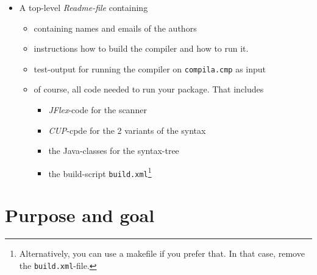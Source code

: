 \documentclass[10pt,freeform]{handout}[2014/08/13]
\begin{document}
\begin{itemize}
\item A top-level \emph{Readme-file} containing
  \begin{itemize}
  \item  containing names and emails of the authors
  \item instructions how to build the compiler and how to run it.
  \item test-output for running the compiler on \texttt{compila.cmp} as
    input
  \item of course, all code needed to run your package. That includes
    \begin{itemize}
    \item \textsl{JFlex}-code for the scanner
    \item \textsl{CUP}-cpde for the 2 variants of the syntax
    \item the Java-classes for the syntax-tree
    \item the build-script \texttt{build.xml}\footnote{Alternatively, you
        can use a makefile if you prefer that. In that case, remove the
        \texttt{build.xml}-file.}
    \end{itemize}
  \end{itemize}


\end{itemize}



\section{Purpose and goal}
\label{sec:x}
\end{document}
